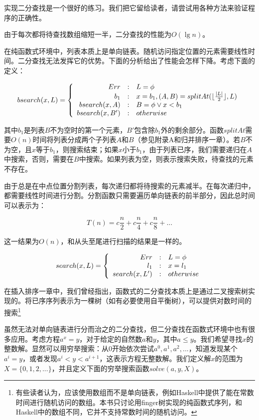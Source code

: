 \documentclass[UTF8]{article}
\begin{document}
实现二分查找是一个很好的练习。我们把它留给读者，请尝试用各种方法来验证程序的正确性。

由于每次都将待查找数组缩短一半，二分查找的性能为$O(\lg n)$。

在纯函数式环境中，列表本质上是单向链表。随机访问指定位置的元素需要线性时间。二分查找无法发挥它的优势。下面的分析给出了性能会怎样下降。考虑下面的定义：

\[
bsearch(x, L) = \left \{
  \begin{array}
  {r@{\quad:\quad}l}
  Err & L = \phi \\
  b_1 & x = b_1, (A, B) = splitAt(\lfloor \frac{|L|}{2} \rfloor, L) \\
  bsearch(x, A) & B = \phi \lor x < b_1 \\
  bsearch(x, B') & otherwise
  \end{array}
\right.
\]

其中$b_1$是列表$B$不为空时的第一个元素，$B'$包含除$b_1$外的剩余部分。函数$splitAt$需要$O(n)$时间将列表分成两个子列表$A$和$B$（参见附录A和归并排序一章）。若$B$不为空，且$x$等于$b_1$，则搜索结束；如果$x$小于$b_1$，由于列表已序，我们需要递归在$A$中搜索，否则，需要在$B$中搜索。如果列表为空，则表示搜索失败，待查找的元素不存在。

由于总是在中点位置分割列表，每次递归都将待搜索的元素减半。在每次递归中，都需要线性时间进行分割。分割函数只需要遍历单向链表的前半部分，因此总时间可以表示为：

\[
T(n) = c \frac{n}{2} + c \frac{n}{4} + c \frac{n}{8} + ...
\]

这一结果为$O(n)$，和从头至尾进行扫描的结果是一样的。

\[
search(x, L) = \left \{
  \begin{array}
  {r@{\quad:\quad}l}
  Err & L = \phi \\
  l_1 & x = l_1 \\
  search(x, L') & otherwise
  \end{array}
\right.
\]

在插入排序一章中，我们曾经指出，函数式的二分查找本质上是通过二叉搜索树实现的。将已序序列表示为一棵树（如有必要使用自平衡树），可以提供对数时间的搜索\footnote{有些读者认为，应该使用数组而不是单向链表，例如Haskell中提供了能在常数时间进行随机访问的数组。本书只讨论用finger树实现的纯函数式序列，和Haskell中的数组不同，它并不支持常数时间的随机访问。}

虽然无法对单向链表进行分而治之的二分查找，但二分查找在函数式环境中也有很多应用。考虑方程$a^x = y$，对于给定的自然数$a$和$y$，其中$a \leq y$。我们希望寻找$x$的整数解。显然可以用穷举搜索：从0开始依次尝试$a^0, a^1, a^2, ...$，知道发现某个$a^i = y$，或者发现$a^i < y < a^{i+1}$，这表示方程无整数解。我们定义解$x$的范围为$X = \{0, 1, 2, ...\}$，并且定义下面的穷举搜索函数$solve(a, y, X)$。
\end{document}
